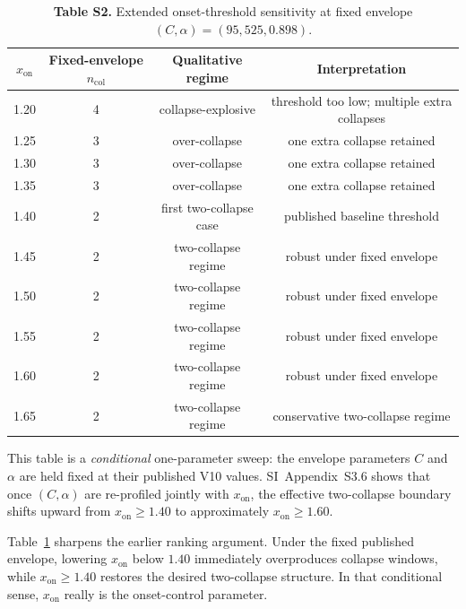 \documentclass[11pt]{article}
\newcommand{\xon}{x_{\mathrm{on}}}
\begin{document}
\begin{table}[H]
\captionsetup{labelformat=empty}
\centering
\begin{threeparttable}
\caption{\textbf{Table S2.} Extended onset-threshold sensitivity at fixed envelope \((C,\alpha)=(95{,}525,0.898)\).}
\label{tab:S2}
\small
\begin{tabular}{cccc}
\toprule
$\xon$ & Fixed-envelope $n_{\mathrm{col}}$ & Qualitative regime & Interpretation \\
\midrule
1.20 & 4 & collapse-explosive & threshold too low; multiple extra collapses \\
1.25 & 3 & over-collapse & one extra collapse retained \\
1.30 & 3 & over-collapse & one extra collapse retained \\
1.35 & 3 & over-collapse & one extra collapse retained \\
1.40 & 2 & first two-collapse case & published baseline threshold \\
1.45 & 2 & two-collapse regime & robust under fixed envelope \\
1.50 & 2 & two-collapse regime & robust under fixed envelope \\
1.55 & 2 & two-collapse regime & robust under fixed envelope \\
1.60 & 2 & two-collapse regime & robust under fixed envelope \\
1.65 & 2 & two-collapse regime & conservative two-collapse regime \\
\bottomrule
\end{tabular}
\begin{tablenotes}[flushleft]
\footnotesize
\item This table is a \emph{conditional} one-parameter sweep: the envelope parameters \(C\) and \(\alpha\) are held fixed at their published V10 values. SI~Appendix~S3.6 shows that once \((C,\alpha)\) are re-profiled jointly with \(\xon\), the effective two-collapse boundary shifts upward from \(\xon\ge 1.40\) to approximately \(\xon\ge 1.60\).
\end{tablenotes}
\end{threeparttable}
\end{table}

Table~\ref{tab:S2} sharpens the earlier ranking argument. Under the fixed published envelope, lowering $\xon$ below $1.40$ immediately overproduces collapse windows, while $\xon\ge 1.40$ restores the desired two-collapse structure. In that conditional sense, $\xon$ really is the onset-control parameter.
\end{document}
